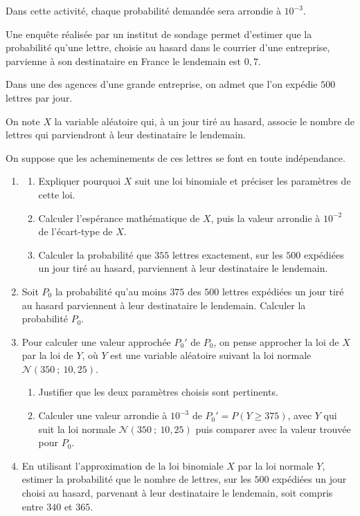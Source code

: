 \begin{exercice_cours}[\quad]{Dans cette activité, chaque probabilité demandée sera arrondie à $10^{-3}$.}



Une enquête réalisée par un institut de sondage permet d'estimer que la probabilité qu'une lettre, choisie au hasard dans le courrier d'une entreprise, parvienne à son destinataire en France le lendemain est $0,7$.

Dans une des agences d'une grande entreprise, on admet que l'on expédie $500$ lettres par jour.

On note $X$ la variable aléatoire qui, à un jour tiré au hasard, associe le nombre de lettres qui parviendront à leur destinataire le lendemain.

On suppose que les acheminements de ces lettres se font en toute indépendance.

\begin{enumerate}
  \item 
  \begin{enumerate}
    \item Expliquer pourquoi $X$ suit une loi binomiale et préciser les paramètres de cette loi.
    
    \item Calculer l'espérance mathématique de $X$, puis la valeur arrondie à $10^{-2}$ de l'écart-type de $X$.
    
    \item Calculer la probabilité que $355$ lettres exactement, sur les $500$ expédiées un jour tiré au hasard, parviennent à leur destinataire le lendemain.
  \end{enumerate}

  \item Soit $P_0$ la probabilité qu'au moins $375$ des $500$ lettres expédiées un jour tiré au hasard parviennent à leur destinataire le lendemain. Calculer la probabilité $P_0$.

  \item Pour calculer une valeur approchée $P_0'$ de $P_0$, on pense approcher la loi de $X$ par la loi de $Y$, où $Y$ est une variable aléatoire suivant la loi normale $\mathscr{N}(350~;~10,25)$.
  
  \begin{enumerate}
    \item Justifier que les deux paramètres choisis sont pertinents.
    
    \item Calculer une valeur arrondie à $10^{-3}$ de $P_0'=P(Y\geq 375)$, avec $Y$ qui suit la loi normale $\mathscr{N}(350~;~10,25)$ puis comparer avec la valeur trouvée pour $P_0$.
  \end{enumerate}

  \item En utilisant l'approximation de la loi binomiale $X$ par la loi normale $Y$, estimer la probabilité que le nombre de lettres, sur les $500$ expédiées un jour choisi au hasard, parvenant à leur destinataire le lendemain, soit compris entre $340$ et $365$.
\end{enumerate}


\end{exercice_cours}


